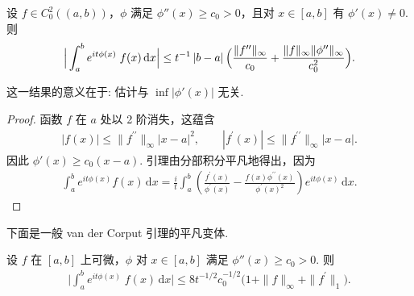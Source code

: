 \begin{lemma}\label{lem:9.5}
设 $f \in C_0^2((a,b))$，$\phi$ 满足 $\phi''(x) \geq c_0 > 0$，且对 $x \in [a,b]$ 有 $\phi'(x) \neq 0$. 则
\begin{align*}
  \Big|\int_{a}^{b}e^{i t\phi(x)}\;f(x)\,\mathrm{d}x\Big|
  \leq t^{-1}\left|b-a\right|\Bigl(\frac{\|f^{\prime\prime}\|_{\infty}}{c_{0}}
  +\frac{\|f\|_{\infty}\|\phi^{\prime\prime}\|_{\infty}}{c_{0}^{2}}\Bigr).
\end{align*}
\end{lemma}

\begin{remark*}
这一结果的意义在于: 估计与 $\inf|\phi'(x)|$ 无关.
\end{remark*}

\begin{proof}
函数 $f$ 在 $a$ 处以 2 阶消失，这蕴含
\begin{align*}
  |f(x)|\leq\|f^{\prime\prime}\|_{\infty}|x-a|^{2},\qquad
  |f^{\prime}(x)|\leq\|f^{\prime\prime}\|_{\infty}|x-a|.
\end{align*}
因此 $\phi'(x) \geq c_0(x - a)$. 引理由分部积分平凡地得出，因为
\begin{align*}
  \int_{a}^{b}e^{i t\phi(x)}f(x)\,\mathrm{d}x
  =\frac{i}{t}\int_{a}^{b}\left(\frac{f^{\prime}(x)}{\phi^{\prime}(x)}
  -\frac{f(x)\phi^{\prime\prime}(x)}{\phi^{\prime}(x)^{2}}\right)e^{i t\phi(x)}\,\mathrm{d}x.
\end{align*}
\end{proof}

下面是一般 van der Corput 引理的平凡变体.

\begin{lemma}\label{lem:9.6}
设 $f$ 在 $[a,b]$ 上可微，$\phi$ 对 $x \in [a,b]$ 满足 $\phi''(x) \geq c_0 > 0$. 则
\begin{align*}
  \Big|\int_{a}^{b}e^{i t\phi(x)}\;f(x)\,\mathrm{d}x\Big|
  \leq 8t^{-1/2}c_{0}^{-1/2}\bigl(1+\|f\|_{\infty}+\|f^{\prime}\|_{1}\bigr).
\end{align*}
\end{lemma}

